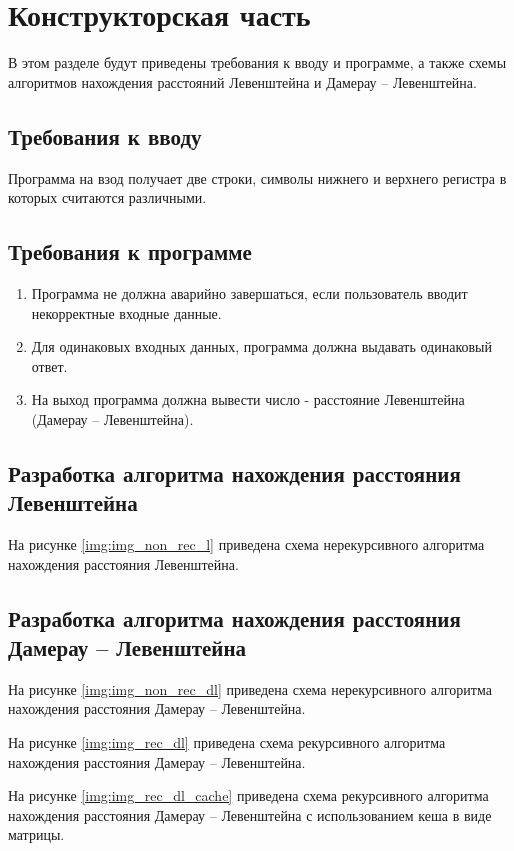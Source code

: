 \chapter{Конструкторская часть}
В этом разделе будут приведены требования к вводу и программе, а также схемы алгоритмов нахождения расстояний Левенштейна и Дамерау -- Левенштейна.

\section{Требования к вводу}

Программа на взод получает две строки, символы нижнего и верхнего регистра в которых считаются различными.

\section{Требования к программе}
\begin{enumerate}
	\item Программа не должна аварийно завершаться, если пользователь вводит некорректные входные данные.
	\item Для одинаковых входных данных, программа должна выдавать одинаковый ответ. 
	\item На выход программа должна вывести число - расстояние Левенштейна (Дамерау -- Левенштейна).
\end{enumerate}

\section{Разработка алгоритма нахождения расстояния Левенштейна}

На рисунке \ref{img:img_non_rec_l} приведена схема нерекурсивного алгоритма нахождения расстояния Левенштейна.

\section{Разработка алгоритма нахождения расстояния Дамерау -- Левенштейна}

На рисунке \ref{img:img_non_rec_dl} приведена схема нерекурсивного алгоритма нахождения расстояния Дамерау -- Левенштейна.

На рисунке \ref{img:img_rec_dl} приведена схема рекурсивного алгоритма нахождения расстояния Дамерау -- Левенштейна.

На рисунке \ref{img:img_rec_dl_cache} приведена схема рекурсивного алгоритма нахождения расстояния Дамерау -- Левенштейна с использованием кеша в виде матрицы.

